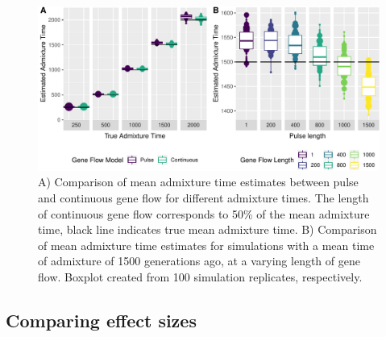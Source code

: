 \documentclass[]{article}
\begin{document}
\begin{figure}
\centering
\includegraphics{Admixture_Time_Inference_Paper_Draft_files/figure-latex/fig2-1.pdf}
\caption{\label{fig:fig2} A) Comparison of mean admixture time estimates
between pulse and continuous gene flow for different admixture times.
The length of continuous gene flow corresponds to 50\% of the mean
admixture time, black line indicates true mean admixture time. B)
Comparison of mean admixture time estimates for simulations with a mean
time of admixture of 1500 generations ago, at a varying length of gene
flow. Boxplot created from 100 simulation replicates, respectively.}
\end{figure}

\subsection{Comparing effect sizes}\label{comparing effect sizes}
\end{document}
